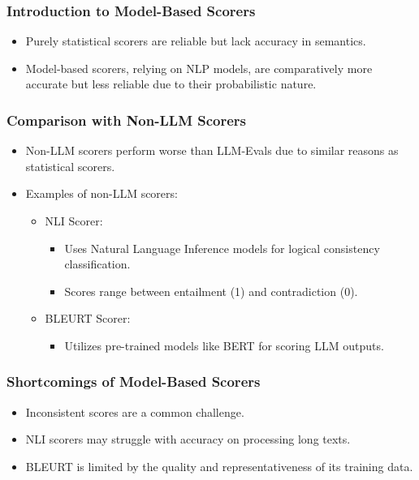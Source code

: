 \begin{frame}[fragile]\frametitle{Introduction to Model-Based Scorers}
  \begin{itemize}
    \item Purely statistical scorers are reliable but lack accuracy in semantics.
    \item Model-based scorers, relying on NLP models, are comparatively more accurate but less reliable due to their probabilistic nature.
  \end{itemize}
\end{frame}

\begin{frame}[fragile]\frametitle{Comparison with Non-LLM Scorers}
  \begin{itemize}
    \item Non-LLM scorers perform worse than LLM-Evals due to similar reasons as statistical scorers.
    \item Examples of non-LLM scorers:
      \begin{itemize}
        \item NLI Scorer:
          \begin{itemize}
            \item Uses Natural Language Inference models for logical consistency classification.
            \item Scores range between entailment (1) and contradiction (0).
          \end{itemize}
        \item BLEURT Scorer:
          \begin{itemize}
            \item Utilizes pre-trained models like BERT for scoring LLM outputs.
          \end{itemize}
      \end{itemize}
  \end{itemize}
\end{frame}

\begin{frame}[fragile]\frametitle{Shortcomings of Model-Based Scorers}
  \begin{itemize}
    \item Inconsistent scores are a common challenge.
    \item NLI scorers may struggle with accuracy on processing long texts.
    \item BLEURT is limited by the quality and representativeness of its training data.
  \end{itemize}
\end{frame}

